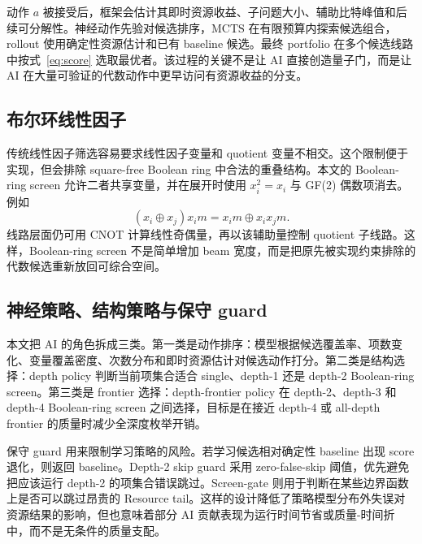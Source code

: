 \documentclass[UTF8,fontset=macnew,11pt]{ctexart}
\newcommand{\screen}{Boolean-ring screen}
\newcommand{\mcts}{\ensuremath{\mathrm{MCTS}}}
\newcommand{\xor}{\ensuremath{\oplus}}
\begin{document}
动作 $a$ 被接受后，框架会估计其即时资源收益、子问题大小、辅助比特峰值和后续可分解性。神经动作先验对候选排序，\mcts{} 在有限预算内探索候选组合，rollout 使用确定性资源估计和已有 baseline 候选。最终 portfolio 在多个候选线路中按式~\eqref{eq:score} 选取最优者。该过程的关键不是让 AI 直接创造量子门，而是让 AI 在大量可验证的代数动作中更早访问有资源收益的分支。

\subsection{布尔环线性因子}

传统线性因子筛选容易要求线性因子变量和 quotient 变量不相交。这个限制便于实现，但会排除 square-free Boolean ring 中合法的重叠结构。本文的 \screen{} 允许二者共享变量，并在展开时使用 $x_i^2=x_i$ 与 GF(2) 偶数项消去。例如
\begin{equation}
  (x_i\xor x_j)x_i m = x_i m \xor x_i x_j m .
  \label{eq:boolean-ring}
\end{equation}
线路层面仍可用 CNOT 计算线性奇偶量，再以该辅助量控制 quotient 子线路。这样，\screen{} 不是简单增加 beam 宽度，而是把原先被实现约束排除的代数候选重新放回可综合空间。

\subsection{神经策略、结构策略与保守 guard}

本文把 AI 的角色拆成三类。第一类是动作排序：模型根据候选覆盖率、项数变化、变量覆盖密度、次数分布和即时资源估计对候选动作打分。第二类是结构选择：depth policy 判断当前项集合适合 single、depth-1 还是 depth-2 \screen{}。第三类是 frontier 选择：depth-frontier policy 在 depth-2、depth-3 和 depth-4 \screen{} 之间选择，目标是在接近 depth-4 或 all-depth frontier 的质量时减少全深度枚举开销。

保守 guard 用来限制学习策略的风险。若学习候选相对确定性 baseline 出现 score 退化，则返回 baseline。Depth-2 skip guard 采用 zero-false-skip 阈值，优先避免把应该运行 depth-2 的项集合错误跳过。Screen-gate 则用于判断在某些边界函数上是否可以跳过昂贵的 Resource tail。这样的设计降低了策略模型分布外失误对资源结果的影响，但也意味着部分 AI 贡献表现为运行时间节省或质量-时间折中，而不是无条件的质量支配。
\end{document}
